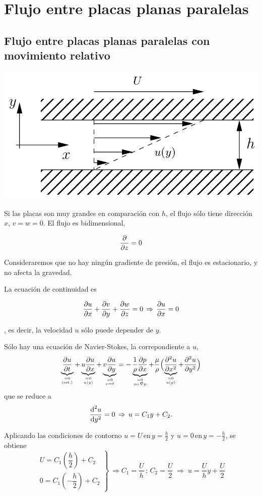 \section{Flujo entre placas planas paralelas}
	
	\subsection{Flujo entre placas planas paralelas con movimiento relativo
	}
	
	\begin{center}
		\includegraphics[width=0.5\linewidth]{TeX_files/chapter05-FlujoViscoco/placas1}
	\end{center}
	
			Si las placas son muy grandes en comparación con $h$, el flujo sólo
			tiene dirección $x$, $v=w=0$. El flujo es bidimensional, 
			
			\begin{equation}
				\frac{\partial }{\partial z}=0
			\end{equation}
			
		
	
	Consideraremos que no hay ningún gradiente de presión, el flujo es
	estacionario, y no afecta la gravedad.
	
	La ecuación de continuidad es 
	
\begin{equation}
		\frac{\partial u}{\partial x}+\frac{\partial v}{\partial y}+\frac{\partial w}{\partial z}=0\,\Rightarrow\,\frac{\partial u}{\partial x}=0
\end{equation}
	
	, es decir, la velocidad $u$ sólo puede depender de $y$.
	
	Sólo hay una ecuación de Navier-Stokes, la correpondiente a $u$,
	\[
	\underbrace{\dparc{u}{t}}_{\binom{=0}{\text{(est.)}}}+\underbrace{u\dparc{u}{x}}_{\binom{=0}{u(y)}}+\underbrace{v\dparc{u}{y}}_{\binom{=0}{v=0}}=-\underbrace{\frac{1}{\rho}\dparc{p}{x}}_{\binom{=0}{\text{no}\,\vec{\nabla}p}}+\frac{\mu}{\rho}\Bigl(\underbrace{\dparcsec{u}{x}}_{\binom{=0}{u(y)}}+\dparcsec{u}{y}\Bigr)
	\]
	que se reduce a 
	\[
	\frac{\text{d}^2 u}{\text{d} y^2}=0\,\Rightarrow\,u=C_{1}y+C_{2}.
	\]
	
	Aplicando las condiciones de contorno \textrm{$u=U\,\text{en}\,y=\frac{h}{2}$
		y $u=0\,\text{en}\,y=-\frac{h}{2}$,} se obtiene 
	\[
	\left.\begin{array}{l}
		U=C_{1}\left(\dfrac{h}{2}\right)+C_{2}\\
		0=C_{1}\left(-\dfrac{h}{2}\right)+C_{2}
	\end{array}\right\} \,\Rightarrow C_{1}=\dfrac{U}{h}\,;\,C_{2}=\dfrac{U}{2}\;\Rightarrow\;\boxed{u=\frac{U}{h}y+\frac{U}{2}}
	\]
	
